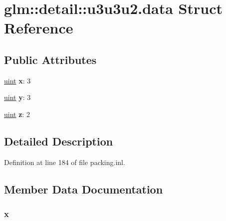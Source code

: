 \hypertarget{structglm_1_1detail_1_1u3u3u2_8data}{}\section{glm\+:\+:detail\+:\+:u3u3u2.\+data Struct Reference}
\label{structglm_1_1detail_1_1u3u3u2_8data}
\subsection*{Public Attributes}
\begin{DoxyCompactItemize}
\item 
\mbox{\label{structglm_1_1detail_1_1u3u3u2_8data_a9dd4e461268c8034f5c8564e155c67a6}} 
\hyperlink{group__core__precision_ga4fd29415871152bfb5abd588334147c8}{uint} {\bfseries x}\+: 3
\item 
\mbox{\label{structglm_1_1detail_1_1u3u3u2_8data_a415290769594460e2e485922904f345d}} 
\hyperlink{group__core__precision_ga4fd29415871152bfb5abd588334147c8}{uint} {\bfseries y}\+: 3
\item 
\mbox{\label{structglm_1_1detail_1_1u3u3u2_8data_afbade9e36a3f36d3d676c1b808451dd7}} 
\hyperlink{group__core__precision_ga4fd29415871152bfb5abd588334147c8}{uint} {\bfseries z}\+: 2
\end{DoxyCompactItemize}


\subsection{Detailed Description}


Definition at line 184 of file packing.\+inl.



\subsection{Member Data Documentation}
\mbox{\label{structglm_1_1detail_1_1u3u3u2_8data_a9dd4e461268c8034f5c8564e155c67a6}} 
\subsubsection{\texorpdfstring{x}{x}}
{\footnotesize\ttfamily }

